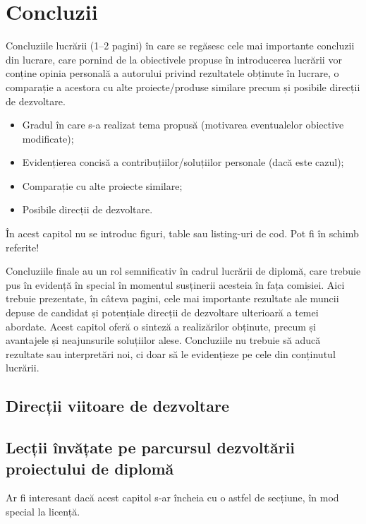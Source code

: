 \chapter{Concluzii}
\label{cap:cap5}

Concluziile lucrării (1–2 pagini) în care se regăsesc cele mai importante concluzii din lucrare, care pornind de la obiectivele propuse în introducerea lucrării vor conține opinia personală a autorului privind rezultatele obținute în lucrare, o comparație a acestora cu alte proiecte/produse similare precum și posibile direcții de dezvoltare. 

\begin{itemize}
    \item Gradul în care s-a realizat tema propusă (motivarea eventualelor obiective modificate);
    \item Evidențierea concisă a contribuțiilor/soluțiilor personale (dacă este cazul);
    \item Comparație cu alte proiecte similare;
    \item Posibile direcții de dezvoltare.
\end{itemize}

În acest capitol nu se introduc figuri, table sau listing-uri de cod. Pot fi în schimb referite!

Concluziile finale au un rol semnificativ în cadrul lucrării de diplomă, care trebuie pus în evidență în special în momentul susținerii acesteia în fața comisiei. Aici trebuie prezentate, în câteva pagini, cele mai importante rezultate ale muncii depuse de candidat și potențiale direcții de dezvoltare ulterioară a temei abordate. Acest capitol oferă o sinteză a realizărilor obținute, precum și avantajele și neajunsurile soluțiilor alese. Concluziile nu trebuie să aducă rezultate sau interpretări noi, ci doar să le evidențieze pe cele din conținutul lucrării.

\section{Direcții viitoare de dezvoltare}
\label{cap:cap5:directii-viitoare}

\textcolor{gray}{\lipsum[1-3]}

\section{Lecții învățate pe parcursul dezvoltării proiectului de diplomă}

Ar fi interesant dacă acest capitol s-ar încheia cu o astfel de secțiune, în mod special la licență.

\textcolor{gray}{\lipsum[2-4]}